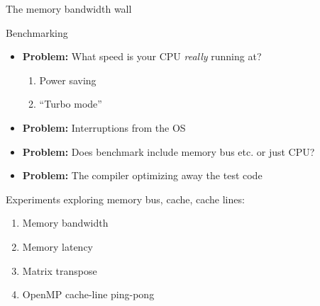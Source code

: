\documentclass[sans,mathserif]{beamer}
\begin{document}
\begin{frame}
  
  \begin{center}
    \Large The memory bandwidth wall
  \end{center}
\end{frame}

\begin{frame}{Benchmarking}

\begin{itemize}
\item<+-> {\bf Problem:} What speed is your CPU {\em really} running at?
  \begin{enumerate}
  \item Power saving
  \item ``Turbo mode''
  \end{enumerate}
\vspace{0.2cm}
\vspace{0.5cm}

\item<+-> {\bf Problem:} Interruptions from the OS\\
\vspace{0.2cm}
\vspace{0.5cm}

\item<+-> {\bf Problem:} Does benchmark include memory bus etc. or just CPU? \\
\vspace{0.5cm}

\item<+-> {\bf Problem:} The compiler optimizing away the test code

\end{itemize}

\end{frame}

\begin{frame}
Experiments exploring memory bus, cache, cache lines:
\begin{enumerate}
\item<+-> Memory bandwidth
\item<+-> Memory latency
\item<+-> Matrix transpose
\item<+-> OpenMP cache-line ping-pong
\end{enumerate}
\end{frame}
\end{document}
